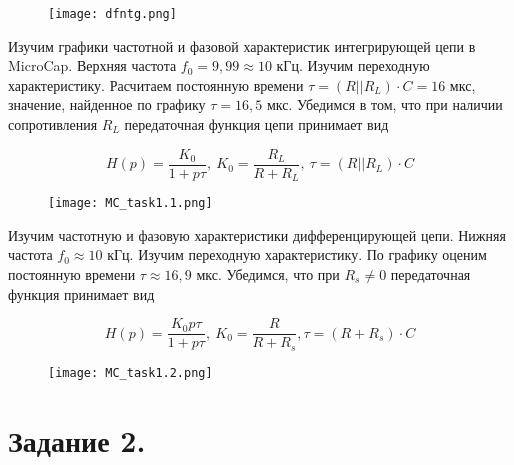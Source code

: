 	\begin{figure}[h!]
		\centering
		\texttt{[image: dfntg.png]}
		\caption{}
	\end{figure}


	\noindent Изучим графики частотной и фазовой характеристик интегрирующей цепи в MicroCap. 
	Верхняя частота $f_0 = 9,99 \approx 10$ кГц. Изучим переходную характеристику.
	\vspace*{5mm}
	\noindent Расчитаем постоянную времени $\tau = (R || R_L) \cdot C = 16$ мкс, значение, найденное по графику $\tau = 16,5$ мкс.
	\vspace*{5mm}
	\noindent Убедимся в том, что при наличии сопротивления $R_L$ передаточная функция
	цепи принимает вид

	\begin{equation*}
		H(p) = \frac{K_0}{1 + p \tau}, ~ K_0 = \frac{R_L}{R + R_L}, ~ \tau = (R || R_L) \cdot C
	\end{equation*}

	\begin{figure}[h!]
		\centering
		\texttt{[image: MC\_task1.1.png]}
		\caption{}
	\end{figure}


	\noindent Изучим частотную и фазовую характеристики дифференцирующей цепи. Нижняя частота $f_0 \approx 10$ кГц. Изучим переходную
	характеристику. По графику оценим постоянную времени $\tau \approx 16,9$ мкс. 
	Убедимся, что при $R_s \neq 0$ передаточная функция принимает вид

	\begin{equation*}
		H(p) = \frac{K_0 p \tau}{1 + p \tau}, ~ K_0 = \frac{R}{R + R_s}, \tau = (R + R_s) \cdot C
	\end{equation*}

	\begin{figure}[h!]
		\centering
		\texttt{[image: MC\_task1.2.png]}
		\caption{}
	\end{figure}	

	
	\section*{Задание 2.}

